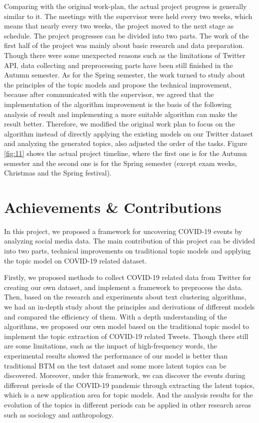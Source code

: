 Comparing with the original work-plan, the actual project progress is generally similar to it. The meetings with the supervisor were held every two weeks, which means that nearly every two weeks, the project moved to the next stage as schedule. The project progresses can be divided into two parts. The work of the first half of the project was mainly about basic research and data preparation. Though there were some unexpected reasons such as the limitations of Twitter API, data collecting and preprocessing parts have been still finished in the Autumn semester. As for the Spring semester, the work turned to study about the principles of the topic models and propose the technical improvement, because after communicated with the supervisor, we agreed that the implementation of the algorithm improvement is the basis of the following analysis of result and implementing a more suitable algorithm can make the result better. Therefore, we modified the original work plan to focus on the algorithm instead of directly applying the existing models on our Twitter dataset and analyzing the generated topics, also adjusted the order of the tasks. Figure \ref{fig:11} shows the actual project timeline, where the first one is for the Autumn semester and the second one is for the Spring semester (except exam weeks, Christmas and the Spring festival). 


\section{Achievements \& Contributions}\label{achievement}
In this project, we proposed a framework for uncovering COVID-19 events by analyzing social media data. The main contribution of this project can be divided into two parts, technical improvements on traditional topic models and applying the topic model on COVID-19 related dataset. 

Firstly, we proposed methods to collect COVID-19 related data from Twitter for creating our own dataset, and implement a framework to preprocess the data. Then, based on the research and experiments about text clustering algorithms, we had an in-depth study about the principles and derivations of different models and compared the efficiency of them. With a depth understanding of the algorithms, we proposed our own model based on the traditional topic model to implement the topic extraction of COVID-19 related Tweets. Though there still are some limitations, such as the impact of high-frequency words, the experimental results showed the performance of our model is better than traditional BTM on the test dataset and some more latent topics can be discovered. Moreover, under this framework, we can discover the events during different periods of the COVID-19 pandemic through extracting the latent topics, which is a new application area for topic models. And the analysis results for the evolution of the topics in different periods can be applied in other research areas such as sociology and anthropology. 

